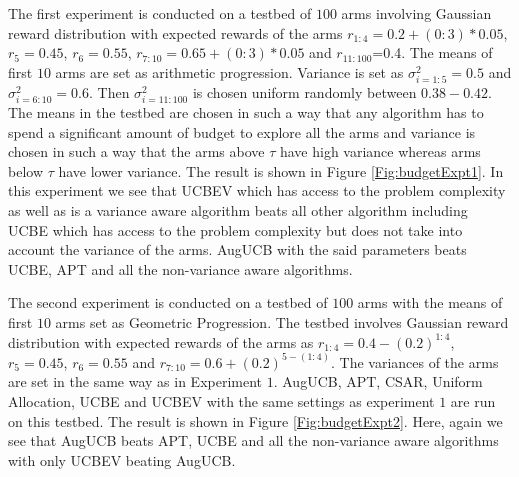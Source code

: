 	The first experiment is conducted on a testbed of $100$ arms involving Gaussian reward distribution with expected rewards of the arms $r_{1:4}=0.2+(0:3)*0.05$, $r_{5}=0.45$, $r_{6}=0.55$, $r_{7:10}=0.65+(0:3)*0.05$ and $r_{11:100}$=0.4. The means of first $10$ arms are set as arithmetic progression. Variance is set as $\sigma_{i=1:5}^{2}=0.5$ and $\sigma_{i=6:10}^{2}=0.6$. Then $\sigma_{i=11:100}^{2}$ is chosen uniform randomly between $0.38-0.42$. The means in the testbed are chosen in such a way that any algorithm has to spend a significant amount of budget to explore all the arms and variance is chosen in such a way that the arms above $\tau$ have high variance whereas arms below $\tau$ have lower variance. The result is shown in Figure \ref{Fig:budgetExpt1}. In this experiment we see that UCBEV which has access to the problem complexity as well as is a variance aware algorithm beats all other algorithm including UCBE which has access to the problem complexity but does not take into account the variance of the arms. AugUCB with the said parameters beats UCBE, APT and all the non-variance aware algorithms.
	
	The second experiment is conducted on a testbed of $100$ arms with the means of first $10$ arms set as Geometric Progression. The testbed involves Gaussian reward distribution with expected rewards of the arms as $r_{1:4}=0.4-(0.2)^{1:4}$, $r_{5}=0.45$, $r_{6}=0.55$ and $r_{7:10}=0.6+(0.2)^{5-(1:4)}$. The variances of the arms are set in the same way as in Experiment $1$. AugUCB, APT, CSAR, Uniform Allocation, UCBE and UCBEV with the same settings as experiment $1$ are run on this testbed. The result is shown in Figure \ref{Fig:budgetExpt2}. Here, again we see that AugUCB beats APT, UCBE and all the non-variance aware algorithms with only UCBEV beating AugUCB. 
	
	



